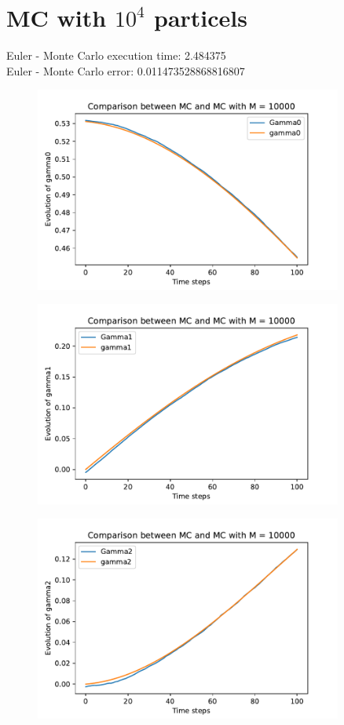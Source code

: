 \documentclass[a4paper,11pt,openright]{report}
\begin{document}
\section{MC with $10^4$ particels}
Euler - Monte Carlo execution time:  2.484375 \\
Euler - Monte Carlo error:  0.011473528868816807

\begin{figure}[H]
\centering
\includegraphics[width=0.9\textwidth]{gamma0 MC = 10000.pdf}
\end{figure}
\begin{figure}[H]
\centering
\includegraphics[width=0.9\textwidth]{gamma1 MC = 10000.pdf}
\end{figure}
\begin{figure}[H]
\centering
\includegraphics[width=0.9\textwidth]{gamma2 MC = 10000.pdf}
\end{figure}
\end{document}
